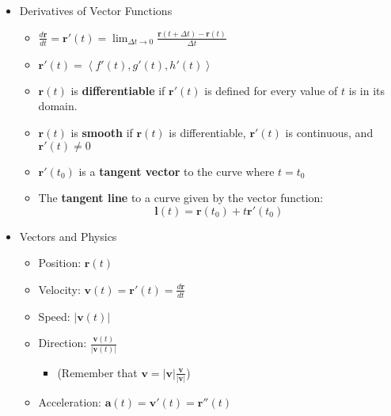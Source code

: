 \documentclass[12pt]{article}
\newcommand{\ds}{\displaystyle}
\renewcommand{\vec}[1]{\mathbf{#1}}
\newcommand{\<}{\left<}
\renewcommand{\>}{\right>}
\begin{document}
\begin{itemize}
  \item Derivatives of Vector Functions
    \begin{itemize}
      \item $\ds \frac{d\vec{r}}{dt} = \vec{r}'(t) = \lim_{\Delta t \to 0} \frac{\vec{r}(t+\Delta t) - \vec{r}(t)}{\Delta t}$
      \item $\vec{r}'(t) = \<f'(t),g'(t),h'(t)\>$
      \item $\vec{r}(t)$ is \textbf{differentiable} if $\vec{r}'(t)$ is defined for every value of $t$ is in its domain.
      \item $\vec{r}(t)$ is \textbf{smooth} if $\vec{r}(t)$ is differentiable, $\vec{r}'(t)$ is continuous, and $\vec{r}'(t) \not= 0$
      \item $\vec{r}'(t_0)$ is a \textbf{tangent vector} to the curve where $t=t_0$
      \item The \textbf{tangent line} to a curve given by the vector function: \[\vec{l}(t)=\vec{r}(t_0)+t\vec{r}'(t_0)\]
    \end{itemize}

  \item Vectors and Physics
    \begin{itemize}
    \item Position: $\vec{r}(t)$
    \item Velocity: $\vec{v}(t) = \vec{r}'(t) = \frac{d\vec{r}}{dt}$
    \item Speed: $|\vec{v}(t)|$ 
    \item Direction: $\frac{\vec{v}(t)}{|\vec{v}(t)|}$ 
      \begin{itemize}
        \item (Remember that $\vec{v}=|\vec{v}|\frac{\vec{v}}{|\vec{v}|}$)
      \end{itemize}
    \item Acceleration: $\vec{a}(t) = \vec{v}'(t) = \vec{r}''(t)$ 
    \end{itemize}
  

\end{itemize}
\end{document}
